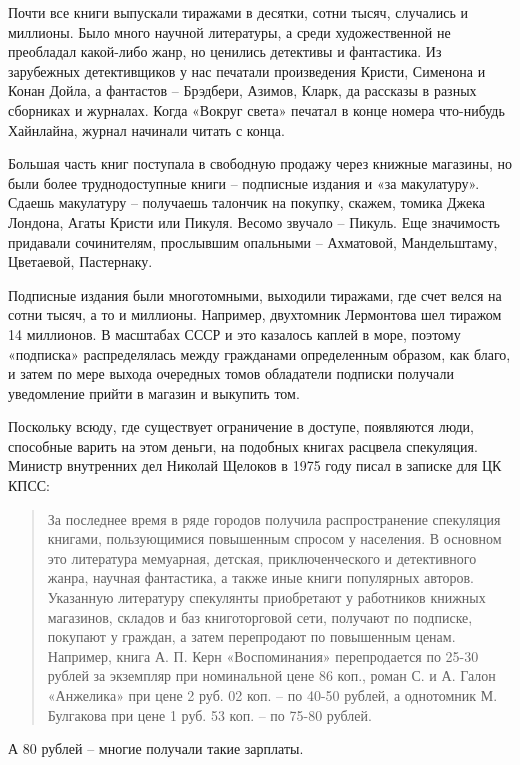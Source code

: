 Почти все книги выпускали тиражами в десятки, сотни тысяч, случались и миллионы. Было много научной литературы, а среди художественной не преобладал какой-либо жанр, но ценились детективы и фантастика. Из зарубежных детективщиков у нас печатали произведения Кристи, Сименона и Конан Дойла, а фантастов – Брэдбери, Азимов, Кларк, да рассказы в разных сборниках и журналах. Когда «Вокруг света» печатал в конце номера что-нибудь Хайнлайна, журнал начинали читать с конца.

Большая часть книг поступала в свободную продажу через книжные магазины, но были более труднодоступные книги – подписные издания и «за макулатуру». Сдаешь макулатуру – получаешь талончик на покупку, скажем, томика Джека Лондона, Агаты Кристи или Пикуля. Весомо звучало – Пикуль. Еще значимость придавали сочинителям, прослывшим опальными – Ахматовой, Мандельштаму, Цветаевой, Пастернаку.

Подписные издания были многотомными, выходили  тиражами, где счет велся на сотни тысяч, а то и миллионы. Например, двухтомник Лермонтова шел тиражом 14 миллионов. В масштабах СССР и это казалось каплей в море, поэтому «подписка» распределялась между гражданами определенным образом, как благо, и затем по мере выхода очередных томов обладатели подписки получали уведомление прийти в магазин и выкупить том.

Поскольку всюду, где существует ограничение в доступе, появляются люди, способные варить на этом деньги, на подобных книгах расцвела спекуляция. Министр внутренних дел Николай Щелоков в 1975 году писал в записке для ЦК КПСС:

\begin{quotation}
За последнее время в ряде городов получила распространение спекуляция книгами, пользующимися повышенным спросом у населения. В основном это литература мемуарная, детская, приключенческого и детективного жанра, научная фантастика, а также иные книги популярных авторов. Указанную литературу спекулянты приобретают у работников книжных магазинов, складов и баз книготорговой сети, получают по подписке, покупают у граждан, а затем перепродают по повышенным ценам. Например, книга А. П. Керн «Воспоминания» перепродается по 25-30 рублей за экземпляр при номинальной цене 86 коп., роман С. и А. Галон «Анжелика» при цене 2 руб. 02 коп. – по 40-50 рублей, а однотомник М. Булгакова при цене 1 руб. 53 коп. – по 75-80 рублей. 
\end{quotation}

А 80 рублей – многие получали такие зарплаты.

